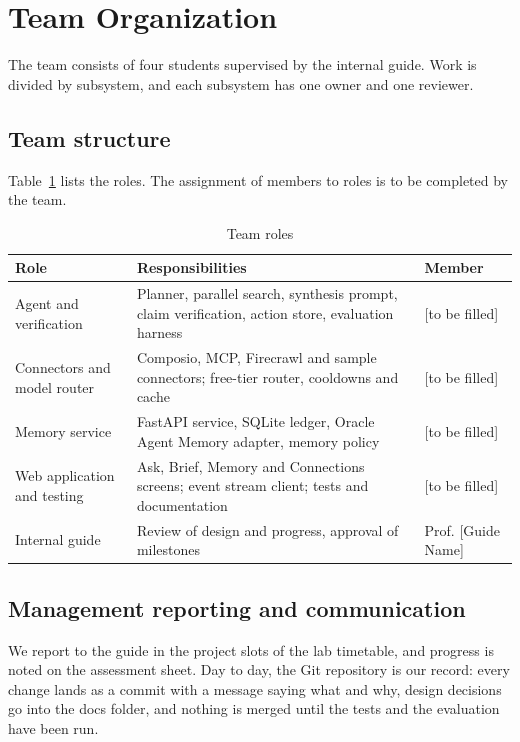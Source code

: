 \documentclass[oneside,a4paper,12pt]{report}
\begin{document}
\section{Team Organization}
\label{sec:team}
The team consists of four students supervised by the internal guide. Work is divided by subsystem, and each subsystem has one owner and one reviewer.
\subsection{Team structure}
Table~\ref{tab:roles} lists the roles. The assignment of members to roles is to be completed by the team.

\begin{table}[!htbp]
\begin{center}
\def\arraystretch{1.4}
\begin{tabularx}{\textwidth}{| p{4.2cm} | X | p{2.8cm} |}
\hline
Role & Responsibilities & Member \\ \hline
Agent and verification & Planner, parallel search, synthesis prompt, claim verification, action store, evaluation harness & [to be filled] \\ \hline
Connectors and model router & Composio, MCP, Firecrawl and sample connectors; free-tier router, cooldowns and cache & [to be filled] \\ \hline
Memory service & FastAPI service, SQLite ledger, Oracle Agent Memory adapter, memory policy & [to be filled] \\ \hline
Web application and testing & Ask, Brief, Memory and Connections screens; event stream client; tests and documentation & [to be filled] \\ \hline
Internal guide & Review of design and progress, approval of milestones & Prof. [Guide Name] \\ \hline
\end{tabularx}
\end{center}
\caption{Team roles}
\label{tab:roles}
\end{table}

\subsection{Management reporting and communication}
We report to the guide in the project slots of the lab timetable, and progress is noted on the assessment sheet. Day to day, the Git repository is our record: every change lands as a commit with a message saying what and why, design decisions go into the docs folder, and nothing is merged until the tests and the evaluation have been run.
\end{document}
